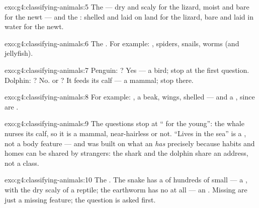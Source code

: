 \begin{solution}{exo:g4:classifying-animals:5}
The  --- dry and scaly for the lizard, moist and bare for
the newt --- and the : shelled and laid on land for the
lizard, bare and laid in water for the newt.
\end{solution}

\begin{solution}{exo:g4:classifying-animals:6}
The . For example: , spiders, snails,
worms (and jellyfish).
\end{solution}

\begin{solution}{exo:g4:classifying-animals:7}
Penguin: ? Yes --- a bird; stop at the first question.
Dolphin: ? No.  or ? It feeds its calf  ---
a mammal; stop there.
\end{solution}

\begin{solution}{exo:g4:classifying-animals:8}
For example: , a beak, wings, shelled  --- and a
, since  are .
\end{solution}

\begin{solution}{exo:g4:classifying-animals:9}
The questions stop at `` for the young'': the whale nurses
its calf, so it is a mammal, near-hairless or not. ``Lives in
the sea'' is a , not a body feature --- and
 was built on what an  \emph{has} precisely
because habits and homes can be shared by strangers: the shark
and the dolphin share an address, not a class.
\end{solution}

\begin{solution}{exo:g4:classifying-animals:10}
The . The snake has a  of hundreds of small 
--- a , with the dry scaly  of a reptile; the
earthworm has no  at all --- an . Missing
 are just a missing feature; the  question is asked
first.
\end{solution}

